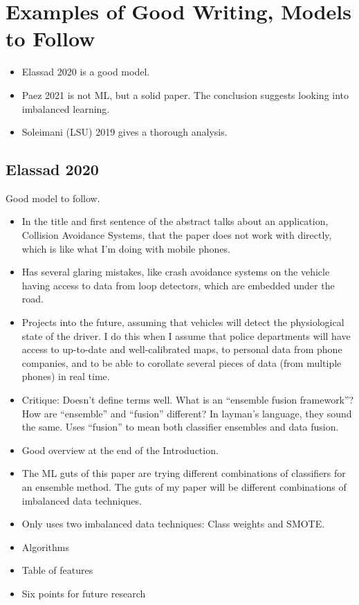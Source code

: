 \section{Examples of Good Writing, Models to Follow}

\begin{itemize}
	\item Elassad 2020 \cite{ELAMRANIABOUELASSAD2020102708} is a good model.	

	\item Paez 2021 \cite{PAEZ2020105666} is not ML, but a solid paper.  The conclusion suggests looking into imbalanced learning.  
	
	\item Soleimani (LSU) 2019 \cite{SOLEIMANI201965} gives a thorough analysis.
\end{itemize}

\subsection{Elassad 2020}

Good model to follow.

\begin{itemize}
	\item In the title and first sentence of the abstract talks about an application, Collision Avoidance Systems, that the paper does not work with directly, which is like what I'm doing with mobile phones.  
	\item Has several glaring mistakes, like crash avoidance systems on the vehicle having access to data from loop detectors, which are embedded under the road.  
	\item Projects into the future, assuming that vehicles will detect the physiological state of the driver.  I do this when I assume that police departments will have access to up-to-date and well-calibrated maps, to personal data from phone companies, and to be able to corollate several pieces of data (from multiple phones) in real time.  
	\item Critique:  Doesn't define terms well.  What is an ``ensemble fusion framework''?  How are ``ensemble'' and ``fusion'' different?  In layman's language, they sound the same.  Uses ``fusion'' to mean both classifier ensembles and data fusion.
	\item Good overview at the end of the Introduction.  
	\item The ML guts of this paper are trying different combinations of classifiers for an ensemble method.  The guts of my paper will be different combinations of imbalanced data techniques.
	\item Only uses two imbalanced data techniques:  Class weights and SMOTE.
	\item Algorithms
	\item Table of features
	\item Six points for future research
\end{itemize}

